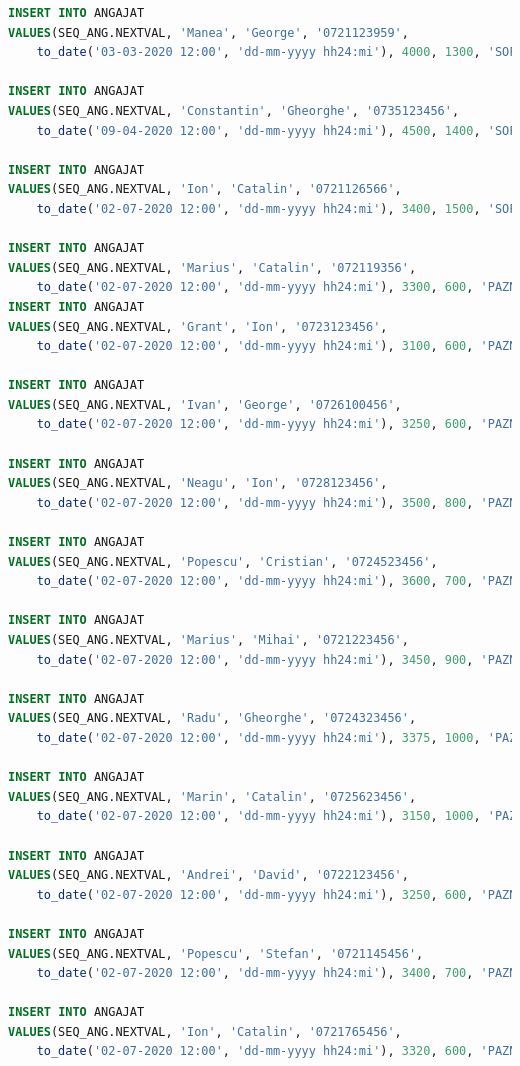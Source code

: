 \documentclass[12pt, a4paper]{article}
\begin{document}
\begin{lstlisting}[language=SQL]
INSERT INTO ANGAJAT
VALUES(SEQ_ANG.NEXTVAL, 'Manea', 'George', '0721123959', 
    to_date('03-03-2020 12:00', 'dd-mm-yyyy hh24:mi'), 4000, 1300, 'SOFER', null);
    
INSERT INTO ANGAJAT
VALUES(SEQ_ANG.NEXTVAL, 'Constantin', 'Gheorghe', '0735123456', 
    to_date('09-04-2020 12:00', 'dd-mm-yyyy hh24:mi'), 4500, 1400, 'SOFER', null);
    
INSERT INTO ANGAJAT
VALUES(SEQ_ANG.NEXTVAL, 'Ion', 'Catalin', '0721126566', 
    to_date('02-07-2020 12:00', 'dd-mm-yyyy hh24:mi'), 3400, 1500, 'SOFER', null);

INSERT INTO ANGAJAT
VALUES(SEQ_ANG.NEXTVAL, 'Marius', 'Catalin', '072119356', 
    to_date('02-07-2020 12:00', 'dd-mm-yyyy hh24:mi'), 3300, 600, 'PAZNIC', 1);
INSERT INTO ANGAJAT
VALUES(SEQ_ANG.NEXTVAL, 'Grant', 'Ion', '0723123456', 
    to_date('02-07-2020 12:00', 'dd-mm-yyyy hh24:mi'), 3100, 600, 'PAZNIC', 1);

INSERT INTO ANGAJAT
VALUES(SEQ_ANG.NEXTVAL, 'Ivan', 'George', '0726100456', 
    to_date('02-07-2020 12:00', 'dd-mm-yyyy hh24:mi'), 3250, 600, 'PAZNIC', 2);

INSERT INTO ANGAJAT
VALUES(SEQ_ANG.NEXTVAL, 'Neagu', 'Ion', '0728123456', 
    to_date('02-07-2020 12:00', 'dd-mm-yyyy hh24:mi'), 3500, 800, 'PAZNIC', 3);

INSERT INTO ANGAJAT
VALUES(SEQ_ANG.NEXTVAL, 'Popescu', 'Cristian', '0724523456', 
    to_date('02-07-2020 12:00', 'dd-mm-yyyy hh24:mi'), 3600, 700, 'PAZNIC', 4);

INSERT INTO ANGAJAT
VALUES(SEQ_ANG.NEXTVAL, 'Marius', 'Mihai', '0721223456', 
    to_date('02-07-2020 12:00', 'dd-mm-yyyy hh24:mi'), 3450, 900, 'PAZNIC', 5);

INSERT INTO ANGAJAT
VALUES(SEQ_ANG.NEXTVAL, 'Radu', 'Gheorghe', '0724323456', 
    to_date('02-07-2020 12:00', 'dd-mm-yyyy hh24:mi'), 3375, 1000, 'PAZNIC', 6);

INSERT INTO ANGAJAT
VALUES(SEQ_ANG.NEXTVAL, 'Marin', 'Catalin', '0725623456', 
    to_date('02-07-2020 12:00', 'dd-mm-yyyy hh24:mi'), 3150, 1000, 'PAZNIC', 7);

INSERT INTO ANGAJAT
VALUES(SEQ_ANG.NEXTVAL, 'Andrei', 'David', '0722123456', 
    to_date('02-07-2020 12:00', 'dd-mm-yyyy hh24:mi'), 3250, 600, 'PAZNIC', 8);

INSERT INTO ANGAJAT
VALUES(SEQ_ANG.NEXTVAL, 'Popescu', 'Stefan', '0721145456', 
    to_date('02-07-2020 12:00', 'dd-mm-yyyy hh24:mi'), 3400, 700, 'PAZNIC', 9);

INSERT INTO ANGAJAT
VALUES(SEQ_ANG.NEXTVAL, 'Ion', 'Catalin', '0721765456', 
    to_date('02-07-2020 12:00', 'dd-mm-yyyy hh24:mi'), 3320, 600, 'PAZNIC', 10);
         

\end{lstlisting}
\end{document}
